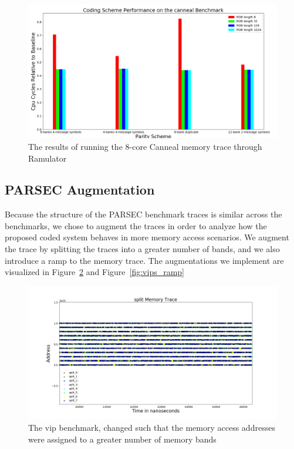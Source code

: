 \begin{figure}[h!]
		\includegraphics[width=\linewidth]{figures/canneal_results.png}
		\caption{The results of running the 8-core Canneal memory trace through Ramulator}
		\label{fig:canneal_results}
\end{figure}
		

\subsection{PARSEC Augmentation}
\label{sec:aug}
Because the structure of the PARSEC benchmark traces is similar across the benchmarks, we chose to augment the traces in order to analyze how the proposed coded system behaves in more memory access scenarios. We augment the trace by splitting the traces into a greater number of bands, and we also introduce a ramp to the memory trace. The augmentations we implement are visualized in Figure~\ref{fig:vips_split} and Figure~\ref{fig:vips_ramp}

\begin{figure}[h!]
		\includegraphics[width=\linewidth]{figures/vips_split.png}
		\caption{The vip benchmark, changed such that the memory access addresses were assigned to a greater number of memory bands}
		\label{fig:vips_split}
\end{figure}

